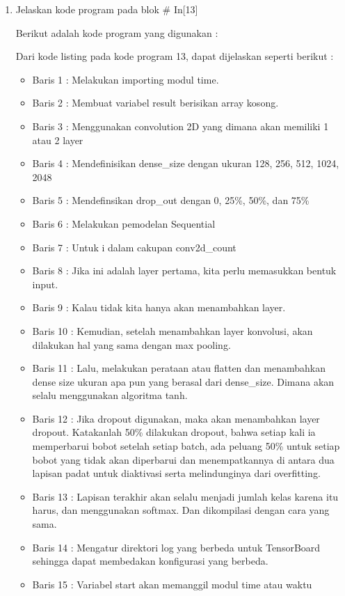 \begin{enumerate}
\item Jelaskan kode program pada blok \# In[13]
	\par Berikut adalah kode program yang digunakan :
	
	\par Dari kode listing pada kode program 13, dapat dijelaskan seperti berikut :
	\begin{itemize}
	\item Baris 1	: Melakukan importing modul time.
	\item Baris 2	: Membuat variabel result berisikan array kosong.
	\item Baris 3	: Menggunakan convolution 2D yang dimana akan memiliki 1 atau 2 layer
	\item Baris 4	: Mendefinisikan dense\_size dengan ukuran 128, 256, 512, 1024, 2048
	\item Baris 5	: Mendefinsikan drop\_out dengan 0, 25\%, 50\%, dan 75\%
	\item Baris 6	: Melakukan pemodelan Sequential
	\item Baris 7	: Untuk i dalam cakupan conv2d\_count
	\item Baris 8	: Jika ini adalah layer pertama, kita perlu memasukkan bentuk input.
	\item Baris 9	: Kalau tidak kita hanya akan menambahkan layer.
	\item Baris 10	: Kemudian, setelah menambahkan layer konvolusi, akan dilakukan hal yang sama dengan max pooling.
	\item Baris 11	: Lalu, melakukan perataan atau flatten dan menambahkan dense size ukuran apa pun yang berasal dari dense\_size. Dimana akan selalu menggunakan algoritma tanh.
	\item Baris 12	: Jika dropout digunakan, maka akan menambahkan layer dropout. Katakanlah 50\% dilakukan dropout, bahwa setiap kali ia memperbarui bobot setelah setiap batch, ada peluang 50\% untuk setiap bobot yang tidak akan diperbarui dan menempatkannya di antara dua lapisan padat untuk diaktivasi serta melindunginya dari overfitting.
	\item Baris 13	:  Lapisan terakhir akan selalu menjadi jumlah kelas karena itu harus, dan menggunakan softmax. Dan dikompilasi dengan cara yang sama.
	\item Baris 14	:  Mengatur direktori log yang berbeda untuk TensorBoard sehingga dapat membedakan konfigurasi yang berbeda.
	\item Baris 15	: Variabel start akan memanggil modul time atau waktu

\end{itemize}
\end{enumerate}
